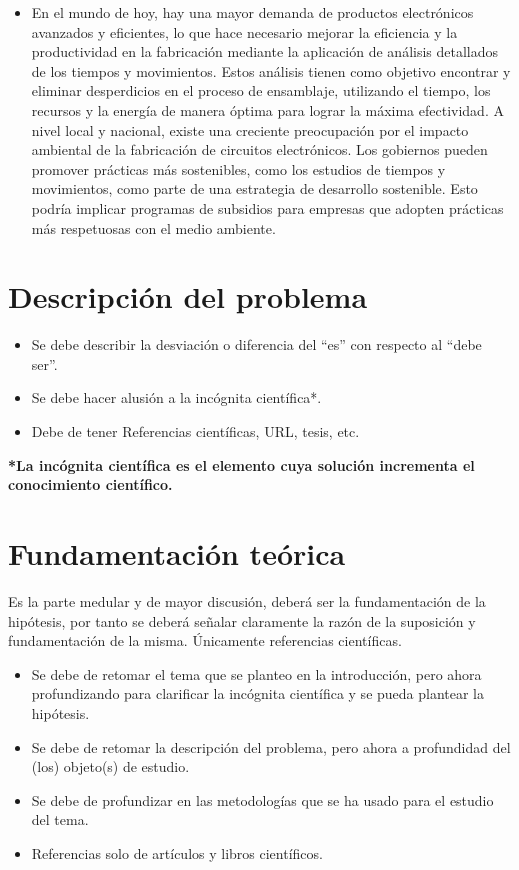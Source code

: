     \begin{itemize}
    \item En el mundo de hoy, hay una mayor demanda de productos electrónicos avanzados y eficientes, lo que hace necesario mejorar la eficiencia y la productividad en la fabricación mediante la aplicación de análisis detallados de los tiempos y movimientos. Estos análisis tienen como objetivo encontrar y eliminar desperdicios en el proceso de ensamblaje, utilizando el tiempo, los recursos y la energía de manera óptima para lograr la máxima efectividad.
    A nivel local y nacional, existe una creciente preocupación por el impacto ambiental de la fabricación de circuitos electrónicos. Los gobiernos pueden promover prácticas más sostenibles, como los estudios de tiempos y movimientos, como parte de una estrategia de desarrollo sostenible. Esto podría implicar programas de subsidios para empresas que adopten prácticas más respetuosas con el medio ambiente.
    \end{itemize}
    \section{Descripción del problema}
    \begin{itemize}
        \item Se debe describir la desviación o diferencia del ``es'' con respecto al ``debe ser''.
        \item Se debe hacer alusión a la incógnita científica*.
        \item Debe de tener Referencias científicas, URL, tesis, etc.
    \end{itemize}
    
    \textbf{*La incógnita científica es el elemento cuya solución incrementa el conocimiento
    científico.}
    \section{Fundamentación teórica}
    
    Es la parte medular y de mayor discusión, deberá ser la fundamentación de la hipótesis, por tanto se deberá señalar claramente la razón de la suposición y fundamentación de la misma. Únicamente referencias científicas.
    \begin{itemize}
        \item Se debe de retomar el tema que se planteo en la introducción, pero ahora profundizando para clarificar la incógnita científica y se pueda plantear la hipótesis.
        \item Se debe de retomar la descripción del problema, pero ahora a profundidad del (los) objeto(s) de estudio.
        \item Se debe de profundizar en las metodologías que se ha usado para el estudio del tema.
        \item Referencias solo de artículos y libros científicos.
    \end{itemize}
